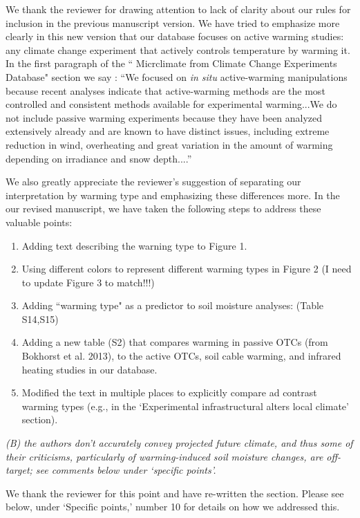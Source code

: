 \documentclass[11pt,a4paper]{letter}
\begin{document}
\par We thank the reviewer for drawing attention to lack of clarity about our rules for inclusion in the previous manuscript version. We have tried to emphasize more clearly in this new version that our database focuses on active warming studies: any climate change experiment that actively controls temperature by warming it. In the first paragraph of the `` Micrclimate from Climate Change Experiments Database" section we say : ``We focused on \textit{in situ} active-warming manipulations because recent analyses indicate that active-warming methods are the most controlled and consistent methods available for experimental warming...We do not include passive warming experiments because they have been analyzed extensively already and are known to have distinct issues, including extreme reduction in wind, overheating and great variation in the amount of warming depending on irradiance and snow depth....'' 
\par We also greatly appreciate the reviewer's suggestion of separating our interpretation by warming type and emphasizing these differences more. In the our revised manuscript, we have taken the following steps to address these valuable points:
\begin{enumerate}
\item Adding text describing the warning type to Figure 1.
\item Using different colors  to represent different warming types in Figure 2 (I need to update Figure 3 to match!!!)
\item Adding ``warming type" as a predictor to soil moisture analyses: (Table S14,S15)
\item Adding a new table (S2) that compares warming in passive OTCs (from Bokhorst et al. 2013), to the active OTCs, soil cable warming, and infrared heating studies in our database.
\item Modified the text in multiple places to explicitly compare ad contrast warming types (e.g., in the `Experimental infrastructural alters local climate' section). 
\end{enumerate}


\par \emph{(B) the authors don't accurately convey projected future climate, and thus some of their criticisms, particularly of warming-induced soil moisture changes, are off-target; see comments below under `specific points'.}

\par We thank the reviewer for this point and have re-written the section. Please see below, under `Specific points,' number 10 for details on how we addressed this. 
\end{document}
